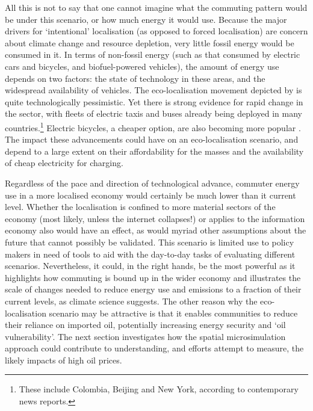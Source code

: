 All this is not to say that one cannot imagine what the commuting pattern would
be under this scenario, or how much energy it would use. Because the major drivers
for `intentional' localisation (as opposed to forced localisation) are
concern about climate change and resource depletion, very little
fossil energy would be consumed in it. In terms of non-fossil energy (such as
that consumed by electric cars and bicycles, and biofuel-powered vehicles),
the amount of energy use depends on two factors: the state of technology in
these areas, and the widespread availability of vehicles. The eco-localisation
movement depicted by \citet{North2010585} is quite technologically pessimistic.
Yet there is strong evidence for rapid change in the sector, with fleets of
electric taxis and buses already being deployed in many
countries.\footnote{These include Colombia, Beijing and New York, according
to contemporary news reports.
}
Electric bicycles, a cheaper option, are also becoming more popular \citep{Pierce2013}.
The impact these advancements could have on an eco-localisation scenario,
and depend to a large extent on their affordability for the masses and the
availability of cheap electricity for charging.

Regardless of the pace and direction of technological advance, commuter
energy use in a more localised economy would certainly be much lower than
it current level. Whether the localisation is confined to more material
sectors of the economy (most likely, unless the internet collapses!) or
applies to the information economy also would have an effect, as would
myriad other assumptions about the future that cannot possibly be validated.
This scenario is limited use to policy makers in need of tools to
aid with the day-to-day tasks of evaluating different scenarios.
Nevertheless, it could, in the right hands, be the most powerful as it
highlights how commuting is bound up in the wider economy and illustrates
the scale of changes needed to reduce energy use and emissions to a fraction
of their current levels, as climate science suggests. The other reason why
the eco-localisation scenario may be attractive is that it enables communities
to reduce their reliance on imported oil, potentially increasing energy
security and `oil vulnerability'. The next section investigates how
the spatial microsimulation approach could contribute to understanding,
and efforts attempt to measure, the likely impacts of high oil prices.


